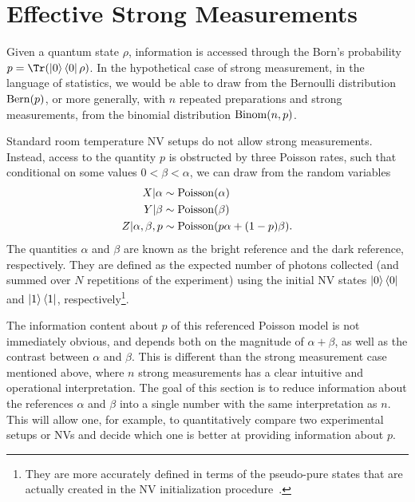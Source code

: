 \documentclass[aps,nofootinbib,twocolumn,superscriptaddress]{revtex4}
\begin{document}
\section{Effective Strong Measurements}
\label{apx:effective-strong-measurements}

Given a quantum state $\rho$,
information is accessed through the
Born's probability $p=\Tr(\ketbra{0}\rho)$.
In the hypothetical case of strong measurement, in the language
of statistics, we would be able to draw from
the Bernoulli distribution $\operatorname{Bern}(p)$, or more generally, with
$n$ repeated preparations and strong measurements, from
the binomial distribution $\operatorname{Binom}(n,p)$.

Standard room temperature NV setups do not allow strong measurements.
Instead, access to the quantity $p$ is obstructed by three Poisson rates,
such that conditional on some values $0<\beta<\alpha$, we can
draw from the random variables
\begin{align}
    X|\alpha &\sim \operatorname{Poisson}(\alpha) \nonumber \\
    Y|\beta &\sim \operatorname{Poisson}(\beta) \nonumber \\
    Z|\alpha,\beta,p &\sim \operatorname{Poisson}(p\alpha + (1-p)\beta).
\end{align}
The quantities $\alpha$ and $\beta$ are known as the bright reference
and the dark reference, respectively.
They are defined as the
expected number of photons collected (and summed over $N$
repetitions of the experiment) using the initial NV states
$\ket{0}\bra{0}$ and $\ket{1}\bra{1}$, respectively\footnote{They are
more accurately defined in terms of the pseudo-pure states
that are actually created in the NV initialization procedure~\cite{hincks_statistical_2018}.}.

The information content about $p$ of this referenced Poisson model is not
immediately obvious,
and depends both on the magnitude of $\alpha+\beta$,
as well as the contrast between $\alpha$ and $\beta$.
This is different than the strong measurement case mentioned above,
where $n$ strong measurements has a clear intuitive and operational
interpretation.
The goal of this section is to reduce information about the references
$\alpha$ and $\beta$ into a single number
with the same interpretation as $n$.
This will allow one, for example,
to quantitatively compare two experimental setups or NVs and
decide which one is better at providing information about $p$.
\end{document}
